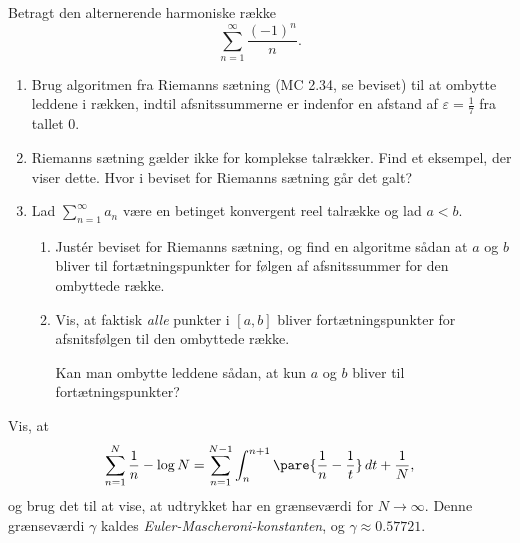 \begin{opg}
Betragt den alternerende harmoniske række 
$$ \sum_{n=1}^\infty\frac{(-1)^n}{n}. $$

\begin{enumerate}
	\item Brug algoritmen fra Riemanns sætning (MC 2.34, se beviset) til at ombytte leddene i rækken, indtil afsnitssummerne er indenfor en afstand af $\varepsilon = \frac{1}{7}$ fra tallet $0$.
	
	\item Riemanns sætning gælder ikke for komplekse talrækker. Find et eksempel, der viser dette. Hvor i beviset for Riemanns sætning går det galt?
	
	\item Lad $\sum_{n=1}^\infty a_n$ være en betinget konvergent reel talrække og lad $a<b$.
	\begin{enumerate}[label=\roman*)]
		\item Justér beviset for Riemanns sætning, og find en algoritme sådan at $a$ og $b$ bliver til fortætningspunkter for følgen af afsnitssummer for den ombyttede række. 

        \item Vis, at faktisk \emph{alle} punkter i $[a,b]$ bliver fortætningspunkter for afsnitsfølgen til den ombyttede række.

        Kan man ombytte leddene sådan, at kun $a$ og $b$ bliver til fortætningspunkter?
	\end{enumerate}
\end{enumerate}
\end{opg}

\begin{opg}
Vis, at 
$$ \sum_{n = 1}^{N} \frac{1}{n} - \log N
    = \sum_{n = 1}^{N - 1} \int_{n}^{n+1} \pare{\frac{1}{n} - \frac{1}{t}} \,dt + \frac{1}{N}, $$
og brug det til at vise, at udtrykket har en grænseværdi for $N \to \infty$.  Denne grænseværdi $\gamma$ kaldes \textit{Euler-Mascheroni-konstanten}, og $\gamma \approx 0.57721$.
\end{opg}